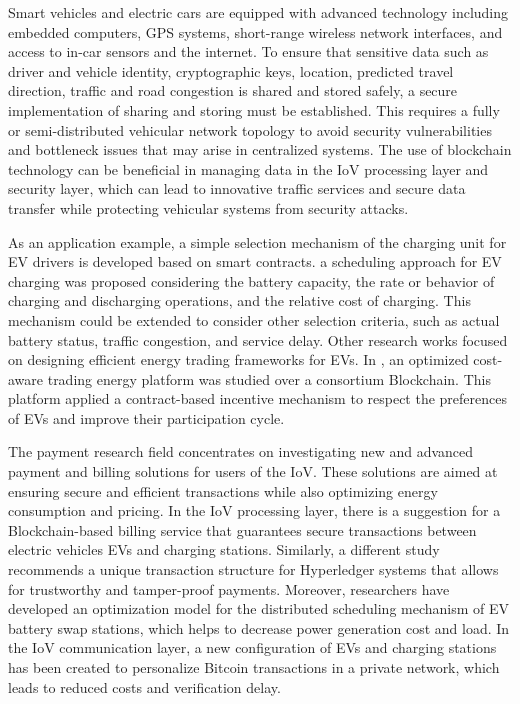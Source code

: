 Smart vehicles and electric cars are equipped with advanced technology including embedded computers, GPS systems, short-range wireless network interfaces, and access to in-car sensors and the internet. To ensure that sensitive data such as driver and vehicle identity, cryptographic keys, location, predicted travel direction, traffic and road congestion is shared and stored safely, a secure implementation of sharing and storing must be established. This requires a fully or semi-distributed vehicular network topology to avoid security vulnerabilities and bottleneck issues that may arise in centralized systems. The use of blockchain technology can be beneficial in managing data in the \ac{IoV} processing layer and security layer, which can lead to innovative traffic services and secure data transfer while protecting vehicular systems from security attacks.

As an application example, a simple selection mechanism of the charging unit for \ac{EV} drivers is developed based on smart contracts. a scheduling approach for \ac{EV} charging was proposed considering the battery capacity, the rate or behavior of charging and discharging operations, and the relative cost of charging. This mechanism could be extended to consider other selection criteria, such as actual battery status, traffic congestion, and service delay. Other research works focused on designing efficient energy trading frameworks for \ac{EV}s. In \cite{jabbar2022blockchain}, an optimized cost-aware trading energy platform was studied over a consortium Blockchain. This platform applied a contract-based incentive mechanism to respect the preferences of \ac{EV}s and improve their participation cycle.

The payment research field concentrates on investigating new and advanced payment and billing solutions for users of the \ac{IoV}. These solutions are aimed at ensuring secure and efficient transactions while also optimizing energy consumption and pricing. In the \ac{IoV} processing layer, there is a suggestion for a Blockchain-based billing service that guarantees secure transactions between electric vehicles \ac{EV}s and charging stations. Similarly, a different study recommends a unique transaction structure for Hyperledger systems that allows for trustworthy and tamper-proof payments. Moreover, researchers have developed an optimization model for the distributed scheduling mechanism of \ac{EV} battery swap stations, which helps to decrease power generation cost and load. In the \ac{IoV} communication layer, a new configuration of \ac{EV}s and charging stations has been created to personalize Bitcoin transactions in a private network, which leads to reduced costs and verification delay.
 
